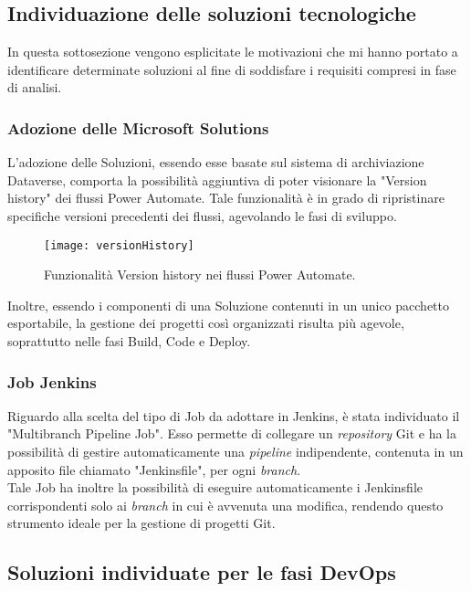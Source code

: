 \subsection{Individuazione delle soluzioni tecnologiche}
In questa sottosezione vengono esplicitate le motivazioni che mi hanno portato a identificare determinate soluzioni al fine di soddisfare i requisiti compresi in fase di analisi.

\subsubsection*{Adozione delle Microsoft Solutions}
L'adozione delle Soluzioni, essendo esse basate sul sistema di archiviazione Dataverse, comporta la possibilità aggiuntiva di poter visionare la "Version history" dei flussi Power Automate. Tale funzionalità è in grado di ripristinare specifiche versioni precedenti dei flussi, agevolando le fasi di sviluppo.
\begin{figure}[htbp] 
    \centering 
    \texttt{[image: versionHistory]} 
    \caption{Funzionalità Version history nei flussi Power Automate.}
    \label{fig:versionHistory}
\end{figure}
\newline \noindent Inoltre, essendo i componenti di una Soluzione contenuti in un unico pacchetto esportabile, la gestione dei progetti così organizzati risulta più agevole, soprattutto nelle fasi Build, Code e Deploy. 

\subsubsection*{Job Jenkins}
Riguardo alla scelta del tipo di Job da adottare in Jenkins, è stata individuato il "Multibranch Pipeline Job". Esso permette di collegare un \emph{repository} Git e ha la possibilità di gestire automaticamente una \emph{pipeline} indipendente, contenuta in un apposito file chiamato "Jenkinsfile", per ogni \emph{branch}.\\
Tale Job ha inoltre la possibilità di eseguire automaticamente i Jenkinsfile corrispondenti solo ai \emph{branch} in cui è avvenuta una modifica, rendendo questo strumento ideale per la gestione di progetti Git.\\

\subsection{Soluzioni individuate per le fasi DevOps}
